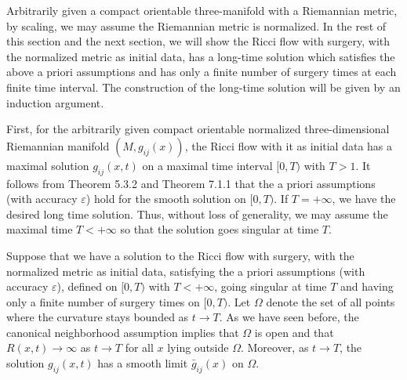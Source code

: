 Arbitrarily given a compact orientable three-manifold with a
Riemannian metric, by scaling, we may assume the Riemannian metric
is normalized. In the rest of this section and the next section,
we will show the Ricci flow with surgery, with the normalized
metric as initial data, has a long-time solution which satisfies
the above a priori assumptions and has only a finite number of
surgery times at each finite time interval. The construction of
the long-time solution will be given by an induction argument.

First, for the arbitrarily given compact orientable normalized
three-dimensional Riemannian manifold $(M,g_{ij}(x))$, the Ricci
flow with it as initial data has a maximal solution $g_{ij}(x,t)$
on a maximal time interval $[0,T)$ with $T>1$. It follows from
Theorem 5.3.2 and Theorem 7.1.1 that the a priori assumptions
(with accuracy $\varepsilon$) hold for the smooth solution on
$[0,T)$. If $T=+\infty$, we have the desired long time solution.
Thus, without loss of generality, we may assume the maximal time
$T<+\infty$ so that the solution goes singular at time $T$.

Suppose that we have a solution to the Ricci flow with surgery,
with the normalized metric as initial data, satisfying the a
priori assumptions (with accuracy $\varepsilon$), defined on
$[0,T)$ with $T<+\infty$, going singular at time $T$ and having
only a finite number of surgery times on $[0,T)$. Let $\Omega$
denote the set of all points where the curvature stays bounded as
$t\rightarrow T$. As we have seen before, the canonical
neighborhood assumption implies that $\Omega$ is open and that
$R(x,t)\rightarrow\infty$ as $t\rightarrow T$ for all $x$ lying
outside $\Omega$. Moreover, as $t\rightarrow T$, the solution
$g_{ij}(x,t)$ has a smooth limit $\bar{g}_{ij}(x)$ on $\Omega$.

